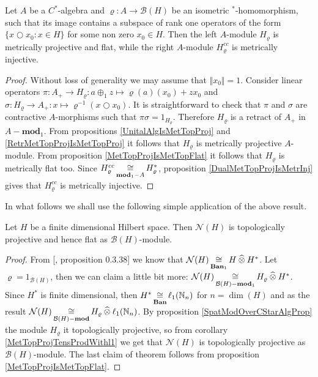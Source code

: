 \begin{proposition}\label{SpatModOverCStarAlgProp} Let $A$ be a $C^*$-algebra and $\varrho:A\to\mathcal{B}(H)$ be an isometric ${}^*$-homomorphism, such that its image contains a subspace of rank one operators of the form $\{x\bigcirc x_0:x\in H\}$ for some non zero $x_0\in H$. Then the left $A$-module $H_\varrho$ is metrically projective and flat, while the  right $A$-module $H_\varrho^{cc}$ is metrically injective.
\end{proposition}
\begin{proof} Without loss of generality we may assume that $\Vert x_0\Vert=1$. Consider linear operators $\pi:A_+\to H_\varrho:a\oplus_1 z\mapsto \varrho(a)(x_0)+zx_0$ and $\sigma:H_\varrho\to A_+:x\mapsto \varrho^{-1}(x\bigcirc x_0)$. It is straightforward to check that $\pi$ and $\sigma$ are contractive $A$-morphisms such that $\pi\sigma=1_{H_\varrho}$. Therefore $H_\varrho$ is a retract of $A_+$ in $A-\mathbf{mod}_1$. From propositions \ref{UnitalAlgIsMetTopProj} and \ref{RetrMetTopProjIsMetTopProj} it follows that $H_\varrho$ is metrically projective $A$-module. From proposition \ref{MetTopProjIsMetTopFlat} it follows that $H_\varrho$ is metrically flat too. Since $H_\varrho^{cc}\mathop{\mathbin{\cong}}\limits_{\mathbf{mod}_1-A}H_\varrho^*$, proposition \ref{DualMetTopProjIsMetrInj} gives that $H_\varrho^{cc}$ is metrically injective.
\end{proof}

In what follows we shall use the following simple application of the above result.

\begin{proposition}\label{FinDimNHModTopProjFlat} Let $H$ be a finite dimensional Hilbert space. Then $\mathcal{N}(H)$ is topologically projective and hence flat as $\mathcal{B}(H)$-module.
\end{proposition}
\begin{proof} From [\cite{HelBanLocConvAlg}, proposition 0.3.38] we know that $\mathcal{N}(H)\mathop{\mathbin{\cong}}\limits_{\mathbf{Ban}_1}H\mathbin{\widehat{\otimes}} H^*$. Let $\varrho=1_{\mathcal{B}(H)}$, then we can claim a little bit more: $\mathcal{N}(H)\mathop{\mathbin{\cong}}\limits_{\mathcal{B}(H)-\mathbf{mod}_1} H_\varrho\mathbin{\widehat{\otimes}} H^*$. Since $H^*$ is finite dimensional, then  $H^*\mathop{\mathbin{\cong}}\limits_{\mathbf{Ban}}\ell_1(\mathbb{N}_n)$ for $n=\dim(H)$ and as the result $\mathcal{N}(H)\mathop{\mathbin{\cong}}\limits_{\mathcal{B}(H)-\mathbf{mod}} H_\varrho\mathbin{\widehat{\otimes}}\ell_1(\mathbb{N}_n)$. By proposition \ref{SpatModOverCStarAlgProp} the module $H_\varrho$ it topologically projective, so from corollary \ref{MetTopProjTensProdWithl1} we get that $\mathcal{N}(H)$ is topologically projective as $\mathcal{B}(H)$-module. The last claim of theorem follows from proposition \ref{MetTopProjIsMetTopFlat}.
\end{proof}

